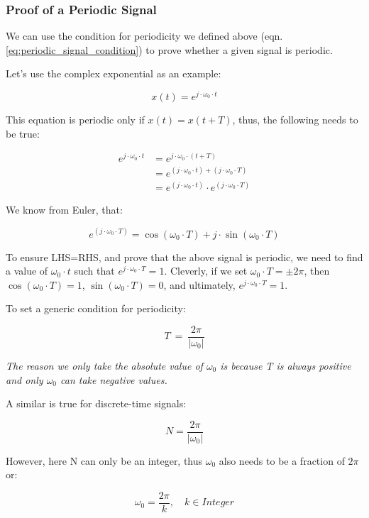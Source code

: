 \documentclass[letterpaper,12pt]{article}
\begin{document}
\subsubsection*{Proof of a Periodic Signal}
We can use the condition for periodicity we defined above (eqn.\ref{eq:periodic_signal_condition}) to prove whether a given signal is periodic.

Let's use the complex exponential as an example:

\[x(t) = e^{j\cdot \omega_0 \cdot t}\]

This equation is periodic only if \(x(t) = x(t + T)\), thus, the following needs to be true:

\begin{equation*}
    \begin{aligned}
        e^{j\cdot \omega_0 \cdot t} & = e^{j\cdot \omega_0 \cdot (t + T)}                                \\
                                    & = e^{(j\cdot \omega_0 \cdot t) + (j\cdot \omega_0 \cdot T)}        \\
                                    & = e^{(j\cdot \omega_0 \cdot t)}\cdot e^{(j\cdot \omega_0 \cdot T)}
    \end{aligned}
\end{equation*}

We know from Euler, that:

\[e^{(j\cdot \omega_0 \cdot T)} = \cos(\omega_0\cdot T) + j\cdot \sin(\omega_0\cdot T)\]

To ensure LHS=RHS, and prove that the above signal is periodic, we need to find a value of $\omega_0\cdot t$ such that $e^{j\cdot \omega_0 \cdot T} = 1$. Cleverly, if we set $\omega_0\cdot T = \pm2\pi$, then $\cos(\omega_0\cdot T) = 1$, $\sin(\omega_0\cdot T) = 0$, and ultimately, $e^{j\cdot \omega_0 \cdot T} = 1$.

To set a generic condition for periodicity:

\[T\ =\ \frac{2\pi}{\left|\omega_{0}\right|}\]

\textit{The reason we only take the absolute value of $\omega_0$ is because T is always positive and only $\omega_0$ can take negative values.}

A similar is true for discrete-time signals:

\[N = \frac{2\pi}{|\omega_0|}\]

However, here N can only be an integer, thus $\omega_0$ also needs to be a fraction of $2\pi$ or:

\[\omega_0 = \frac{2\pi}{k}, \quad k \in Integer\]
\end{document}
